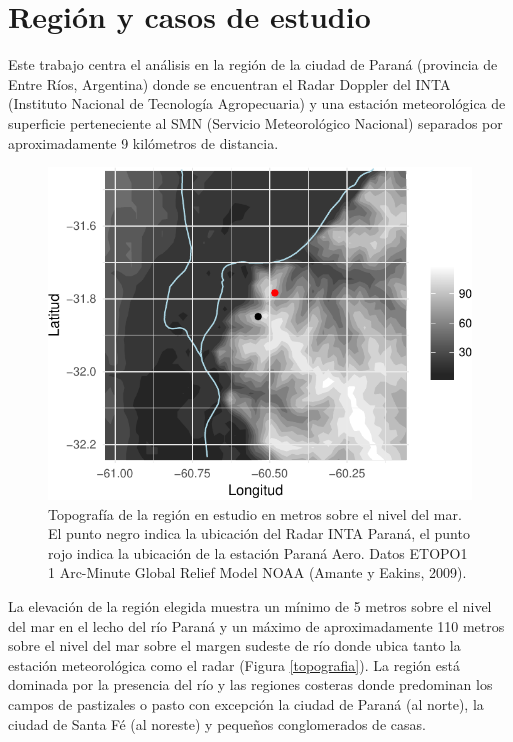 \documentclass[12pt,spanish,oneside]{book}
\begin{document}
\section{Región y casos de estudio}\label{region-y-casos-de-estudio}

Este trabajo centra el análisis en la región de la ciudad de Paraná
(provincia de Entre Ríos, Argentina) donde se encuentran el Radar
Doppler del INTA (Instituto Nacional de Tecnología Agropecuaria) y una
estación meteorológica de superficie perteneciente al SMN (Servicio
Meteorológico Nacional) separados por aproximadamente 9 kilómetros de
distancia.

\begin{figure}

{\centering \includegraphics{Tesis_files/figure-latex/topografia-1} 

}

\caption[Topografía de la región en estudio en metros sobre el nivel del mar.]{Topografía de la región en estudio en metros sobre el nivel del mar. El punto negro indica la ubicación del Radar INTA Paraná, el punto rojo indica la ubicación de la estación Paraná Aero. Datos ETOPO1 1 Arc-Minute Global Relief Model NOAA (Amante y Eakins, 2009). \label{topografia}}\label{fig:topografia}
\end{figure}

La elevación de la región elegida muestra un mínimo de 5 metros sobre el
nivel del mar en el lecho del río Paraná y un máximo de aproximadamente
110 metros sobre el nivel del mar sobre el margen sudeste de río donde
ubica tanto la estación meteorológica como el radar (Figura
\ref{topografia}). La región está dominada por la presencia del río y
las regiones costeras donde predominan los campos de pastizales o pasto
con excepción la ciudad de Paraná (al norte), la ciudad de Santa Fé (al
noreste) y pequeños conglomerados de casas.
\end{document}
